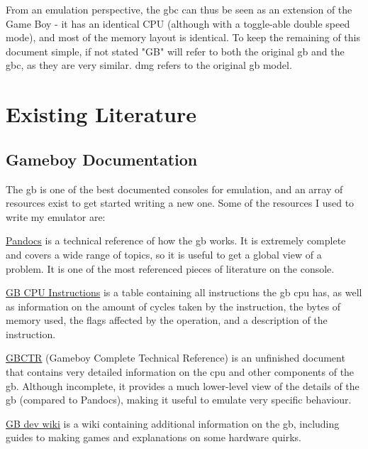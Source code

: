 \documentclass[11pt]{report}
\begin{document}
From an emulation perspective, the \glsdesc{gbc} can thus be seen as an extension of the Game Boy - it has an identical CPU (although with a toggle-able double speed mode), and most of the memory layout is identical. To keep the remaining of this document simple, if not stated "GB" will refer to both the original \glsdesc{gb} and the \glsdesc{gbc}, as they are very similar. \gls{dmg} refers to the original \glsdesc{gb} model.

\section{Existing Literature}

\subsection{Gameboy Documentation}

The \glsdesc{gb} is one of the best documented consoles for emulation, and an array of resources exist to get started writing a new one. Some of the resources I used to write my emulator are:

\begin{compactitem}
    \item \href{https://gbdev.io/pandocs/}{Pandocs} is a technical reference of how the \gls{gb} works. It is extremely complete and covers a wide range of topics, so it is useful to get a global view of a problem. It is one of the most referenced pieces of literature on the console.
    \item \href{https://meganesu.github.io/generate-gb-opcodes/}{GB CPU Instructions} is a table containing all instructions the \gls{gb} \gls{cpu} has, as well as information on the amount of cycles taken by the instruction, the bytes of memory used, the flags affected by the operation, and a description of the instruction.
    \item \href{https://gekkio.fi/files/gb-docs/gbctr.pdf}{GBCTR} (Gameboy Complete Technical Reference) is an unfinished document that contains very detailed information on the \gls{cpu} and other components of the \gls{gb}. Although incomplete, it provides a much lower-level view of the details of the \gls{gb} (compared to Pandocs), making it useful to emulate very specific behaviour.
    \item \href{https://gbdev.gg8.se/wiki/}{GB dev wiki} is a wiki containing additional information on the \gls{gb}, including guides to making games and explanations on some hardware quirks.
\end{compactitem}
\end{document}
